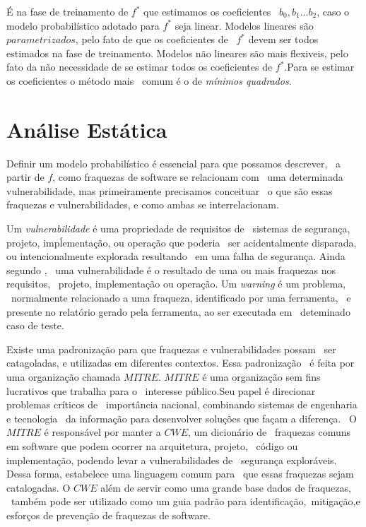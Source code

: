 É na fase de treinamento de $f^*$ que estimamos os coeficientes \ 
$b_0,b_1...b_2$, caso o modelo probabilístico adotado para $f^*$ seja linear.
Modelos lineares são $parametrizados$, pelo fato de que os coeficientes de \
$f^*$ devem ser todos estimados na fase de treinamento. Modelos não lineares
são mais flexiveis, pelo fato da não necessidade de se estimar todos os 
coeficientes de $f^*$.Para se estimar os coeficientes o método mais \ 
comum é o de \textit{mínimos quadrados}\cite{James}.



\section{Análise Estática}
Definir um modelo probabilístico é essencial para que possamos descrever, \
a partir de $f$, como fraquezas de software se relacionam com \
uma determinada vulnerabilidade, mas primeiramente precisamos conceituar \
o que são essas fraquezas e vulnerabilidades, e como ambas se interrelacionam.

Um \textit{vulnerabilidade} é uma propriedade de requisitos de \
sistemas de segurança, projeto, impĺementação, ou operação que poderia \
ser acidentalmente disparada, ou intencionalmente explorada resultando \
em uma falha de segurança\cite{Okun}. Ainda segundo \cite{Okun}, \
uma vulnerabilidade é o resultado de uma ou mais fraquezas nos requisitos, \
projeto, implementação ou operação. Um \textit{warning} é um problema, \
normalmente relacionado a uma fraqueza, identificado por uma ferramenta, \
e presente no relatório gerado pela ferramenta, ao ser executada em \
deteminado caso de teste\cite{Okun}.


Existe uma padronização para que fraquezas e vulnerabilidades possam \
ser catagoladas, e utilizadas em diferentes contextos. Essa padronização \
é feita por uma organização chamada $MITRE$.
$MITRE$ é uma organização sem fins lucrativos que trabalha para o \
interesse público.Seu papel é direcionar problemas críticos de \
importância nacional, combinando sistemas de engenharia e tecnologia \
da informação para desenvolver soluções que façam a diferença\cite{Mitre}. \
O $MITRE$ é responsável por manter a $CWE$, um dicionário de \
fraquezas comuns em software que podem ocorrer na arquitetura, projeto, \
código ou implementação, podendo levar a vulnerabilidades de \
segurança exploráveis. Dessa forma, estabelece uma linguagem comum para \
que essas fraquezas sejam catalogadas.
O $CWE$ além de servir como uma grande base dados de fraquezas, \
também pode ser utilizado como um guia padrão para identificação,\
mitigação,e esforços de prevenção de fraquezas de software\cite{Mitre}.

